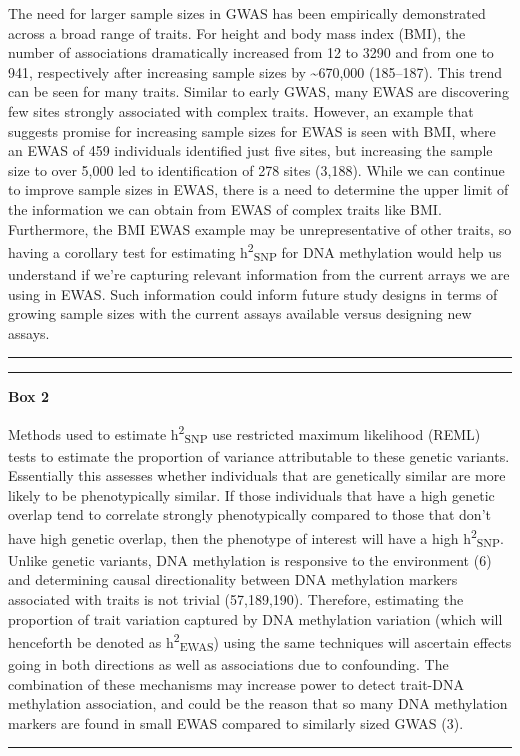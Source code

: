 \documentclass[11pt,twoside]{bristolthesis}
\begin{document}
The need for larger sample sizes in GWAS has been empirically demonstrated across a broad range of traits. For height and body mass index (BMI), the number of associations dramatically increased from 12 to 3290 and from one to 941, respectively after increasing sample sizes by \textasciitilde670,000 (185--187). This trend can be seen for many traits. Similar to early GWAS, many EWAS are discovering few sites strongly associated with complex traits. However, an example that suggests promise for increasing sample sizes for EWAS is seen with BMI, where an EWAS of 459 individuals identified just five sites, but increasing the sample size to over 5,000 led to identification of 278 sites (3,188). While we can continue to improve sample sizes in EWAS, there is a need to determine the upper limit of the information we can obtain from EWAS of complex traits like BMI. Furthermore, the BMI EWAS example may be unrepresentative of other traits, so having a corollary test for estimating h\textsuperscript{2}\textsubscript{SNP} for DNA methylation would help us understand if we're capturing relevant information from the current arrays we are using in EWAS. Such information could inform future study designs in terms of growing sample sizes with the current assays available versus designing new assays.
\begin{center}\rule{0.5\linewidth}{0.5pt}\end{center}
\begin{center}\rule{0.5\linewidth}{0.5pt}\end{center}

\textbf{Box 2}

Methods used to estimate h\textsuperscript{2}\textsubscript{SNP} use restricted maximum likelihood (REML) tests to estimate the proportion of variance attributable to these genetic variants. Essentially this assesses whether individuals that are genetically similar are more likely to be phenotypically similar. If those individuals that have a high genetic overlap tend to correlate strongly phenotypically compared to those that don't have high genetic overlap, then the phenotype of interest will have a high h\textsuperscript{2}\textsubscript{SNP}. Unlike genetic variants, DNA methylation is responsive to the environment (6) and determining causal directionality between DNA methylation markers associated with traits is not trivial (57,189,190). Therefore, estimating the proportion of trait variation captured by DNA methylation variation (which will henceforth be denoted as h\textsuperscript{2}\textsubscript{EWAS}) using the same techniques will ascertain effects going in both directions as well as associations due to confounding. The combination of these mechanisms may increase power to detect trait-DNA methylation association, and could be the reason that so many DNA methylation markers are found in small EWAS compared to similarly sized GWAS (3).
\begin{center}\rule{0.5\linewidth}{0.5pt}\end{center}
\end{document}
